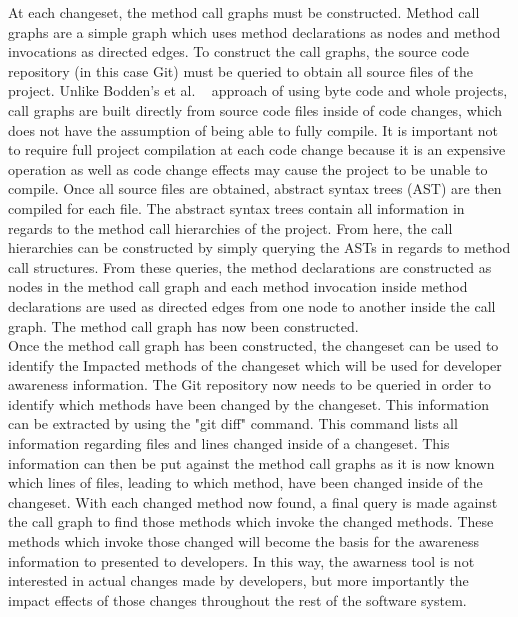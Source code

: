 \documentclass[conference]{IEEEtran}
\begin{document}
At each changeset, the method call graphs must be constructed. Method call graphs are a simple graph which uses
method declarations as nodes and method invocations as directed edges. To construct the call graphs, the source 
code repository (in this case Git) must be queried to obtain all source files of the project. Unlike Bodden's et al.
~\cite{Bodden:2003:HVJ}  approach of using byte code and whole projects, call graphs are built directly from source
code files inside of code changes, which does not have the assumption of being able to fully compile.
It is important not to require full project compilation at each code change because it is an
expensive operation as well as code change effects may cause the project to be unable to compile.
Once all source files are
obtained, abstract syntax trees (AST) are then compiled for each file. The abstract syntax trees contain all information
in regards to the method call hierarchies of the project. From here, the call hierarchies can be constructed by simply
querying the ASTs in regards to method call structures. From these queries, the method declarations are constructed
as nodes in the method call graph and each method invocation inside method declarations are used as directed
edges from one node to another inside the call graph. The method call graph has now been constructed.\\

Once the method call graph has been constructed, the changeset can be used to identify the Impacted methods
of the changeset which will be used for developer awareness information. The Git repository now needs to be
queried in order to identify which methods have been changed by the changeset. This information can be 
extracted by using the "git diff" command. This command lists all information regarding files and lines
changed inside of a changeset. This information can then be put against the method call graphs as it is now 
known which lines of files, leading to which method, have been changed inside of the changeset. With each
changed method now found, a final query is made against the call graph to find those methods which invoke
the changed methods. These methods which invoke those changed will become the basis for the awareness
information to presented to developers. In this way, the awarness tool is not interested in actual changes
made by developers, but more importantly the impact effects of those changes throughout the rest
of the software system. \\
\end{document}
